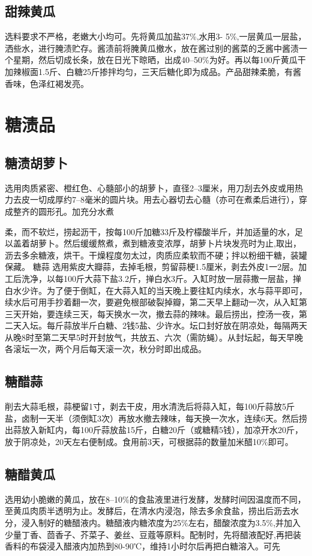 \documentclass{ctexbook}
\begin{document}
\subsection{甜辣黄瓜}
选料要求不严格，老嫩大小均可。先将黄瓜加盐37\%,水用3-
5\%,一层黄瓜一层盐，洒些水，进行腌渍贮存。酱渍前将腌黄瓜撤水，放在酱过别的酱菜的乏酱中酱渍一个星期，然后切成长条，放在日光下晾晒，出成40--50\%为好。再以每100斤黄瓜干加辣椒面1.5斤、白糖25斤掺拌均匀，三天后糖化即为成品。产品甜辣柔脆，有酱香味，色泽红褐发亮。
\section{糖渍品}
\subsection{糖渍胡萝卜}
选用肉质紧密、橙红色、心髓部小的胡萝卜，直径2--3厘米，用刀刮去外皮或用热力去皮一切成厚约7--8毫米的圆片块。用去心器切去心髓（亦可在煮柔后进行），穿成整齐的圆形孔。加充分水煮

柔，而不软烂，捞起沥干，按每100斤加糖33斤及柠檬酸半斤，并加适量的水，足以盖着胡萝卜。然后缓缓熬煮，煮到糖液变浓厚，胡萝卜片块发亮时为止,取出，沥去多余糖液，烘干。干燥程度勿太过，肉质应柔软而不硬；拌以粉细干糖，装罐保藏。
糖蒜
选用紫皮大瓣蒜，去掉毛根，剪留蒜梗1.5厘米，剥去外皮1一2层。加工后洗净，以每100斤大蒜下盐3.2斤，掸白水3斤。入缸时放一层蒜撒一层盐，掸白水少许。为了便于倒缸，在大蒜入缸的当天晚上要往缸内续水，水与蒜平即可，续水后可用手抄着翻一次，要避免根部破裂掉瓣，第二天早上翻动一次，从入缸第三天开始，要连续三天，每天换水一次，撤去蒜的辣味。最后捞出，控汤一夜，第二天入坛。每斤蒜放半斤白糖、2钱5盐、少许水。坛口封好放在阴凉处，每隔两天从晚8时至第二天早5时开封放气，共放五、六次（需防蝇）。从封坛起，每天早晚各滚坛一次，两个月后每天滚一次，秋分时即出成品。
\subsection{糖醋蒜}
削去大蒜毛根，蒜梗留1寸，剥去干皮，用水清洗后将蒜入缸，每100斤蒜放5斤盐，卤制一天半（须倒缸3次）再放水撤去辣味，每天换一次水，连续6天。然后捞出蒜放入新缸内，每100斤蒜放盐15斤，白糖20斤（或糖精5钱），加凉开水20斤，放于阴凉处，20天左右便制成。食用前3天，可根据蒜的数量加米醋10\%即可。
\subsection{糖醋黄瓜}
选用幼小脆嫩的黄瓜，放在8--10\%的食盐液里进行发酵，发酵时间因温度而不同，至黄瓜肉质半透明为止。发酵后，在清水内浸泡，除去多余食盐，捞出后沥去水分，浸入制好的糖醋液内。糖醋液内糖浓度为25\%左右，醋酸浓度为3.5\%,并加入少量丁香、茴香子、芥菜子、姜丝、豆蔻等原料。配制时，先将醋液配好,再把装香料的布袋浸入醋液内加热到80-90℃，维持1小时尔后再把白糖溶入。可先
\end{document}
